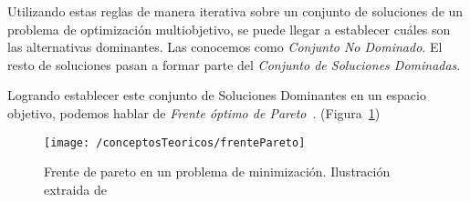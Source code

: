 Utilizando estas reglas de manera iterativa sobre un conjunto de soluciones de un problema de optimización multiobjetivo, se puede llegar a establecer cuáles son las alternativas dominantes. Las conocemos como \textit{Conjunto No Dominado}.
El resto de soluciones pasan a formar parte del \textit{Conjunto de Soluciones Dominadas}. 

Logrando establecer este conjunto de Soluciones Dominantes en un espacio objetivo, podemos hablar de \textit{Frente óptimo de Pareto}~\cite{img:frente_pareto}. (Figura~\ref{fig:frentePareto})

\begin{figure}[ht]
	\centering
	\texttt{[image: /conceptosTeoricos/frentePareto]}
	\caption{Frente de pareto en un problema de minimización. Ilustración extraida de~\cite{img:frente_pareto}}
	\label{fig:frentePareto}
\end{figure}